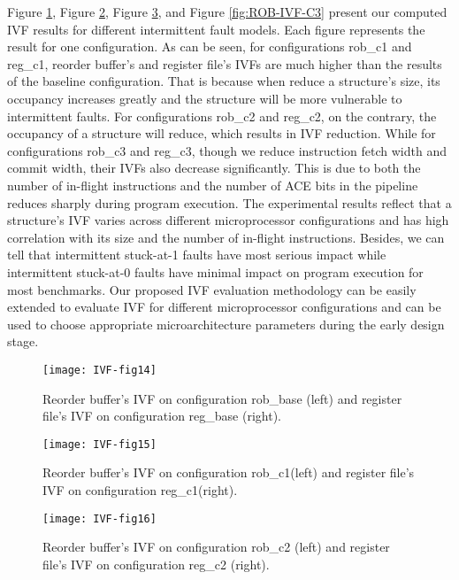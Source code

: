 Figure \ref{fig:ROB-IVF-base}, Figure \ref{fig:ROB-IVF-C1}, Figure \ref{fig:ROB-IVF-C2}, and Figure \ref{fig:ROB-IVF-C3} present our computed IVF results for different intermittent fault models. Each figure represents the result for one configuration. As can be seen, for configurations rob\_c1 and reg\_c1, reorder buffer’s and register file’s IVFs are much higher than the results of the baseline configuration. That is because when reduce a structure’s size, its occupancy increases greatly and the structure will be more vulnerable to intermittent faults. For configurations rob\_c2 and reg\_c2, on the contrary, the occupancy of a structure will reduce, which results in IVF reduction. While for configurations rob\_c3 and reg\_c3, though we reduce instruction fetch width and commit width, their IVFs also decrease significantly. This is due to both the number of in-flight instructions and the number of ACE bits in the pipeline reduces sharply during program execution. The experimental results reflect that a structure’s IVF varies across different microprocessor configurations and has high correlation with its size and the number of in-flight instructions. Besides, we can tell that intermittent stuck-at-1 faults have most serious impact while intermittent stuck-at-0 faults have minimal impact on program execution for most benchmarks. Our proposed IVF evaluation methodology can be easily extended to evaluate IVF for different microprocessor configurations and can be used to choose appropriate microarchitecture parameters during the early design stage.

\begin{figure}[t]
    \centering
    \texttt{[image: IVF-fig14]}\\
    \caption{Reorder buffer's IVF on configuration rob\_base (left) and register file's IVF on configuration reg\_base (right).}
    \label{fig:ROB-IVF-base}
\end{figure}

\begin{figure}[t]
    \centering
    \texttt{[image: IVF-fig15]}\\
    \caption{Reorder buffer's IVF on configuration rob\_c1(left) and register file's IVF on configuration reg\_c1(right).}
    \label{fig:ROB-IVF-C1}
\end{figure}


\begin{figure}[t]
    \centering
    \texttt{[image: IVF-fig16]}\\
    \caption{Reorder buffer's IVF on configuration rob\_c2 (left) and register file's IVF on configuration reg\_c2 (right).}
    \label{fig:ROB-IVF-C2}
\end{figure}


